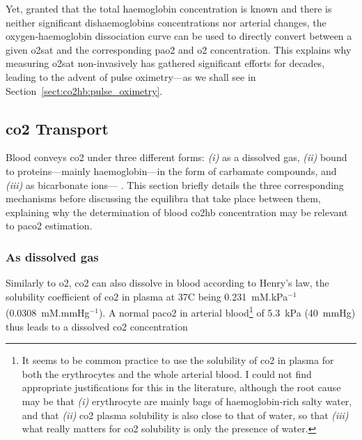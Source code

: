 Yet, granted that the total haemoglobin concentration is known and there is neither significant dishaemoglobins concentrations nor arterial \pH{} changes, the oxygen-haemoglobin dissociation curve can be used to directly convert between a given \gls{o2sat} and the corresponding \gls{pao2} and \gls{o2} concentration\cite[Chap.~11]{nunns}. This explains why measuring \gls{o2sat} non-invasively has gathered significant efforts for decades, leading to the advent of pulse oximetry---as we shall see in Section~\ref{sect:co2hb:pulse_oximetry}.

\subsection{\texorpdfstring{\gls{co2}}{CO2} Transport}\label{subsect:co2hb:co2_transport}

Blood conveys \gls{co2} under three different forms: \textit{(i)} as a dissolved gas, \textit{(ii)} bound to proteins---mainly haemoglobin---in the form of carbamate compounds, and \textit{(iii)} as bicarbonate ions---\ie{} . This section briefly details the three corresponding mechanisms before discussing the equilibra that take place between them, explaining why the determination of blood \gls{co2hb} concentration may be relevant to \gls{paco2} estimation.


\subsubsection{As dissolved gas}

Similarly to \gls{o2}, \gls{co2} can also dissolve in blood according to Henry's law, the solubility coefficient of \gls{co2} in plasma at 37{\degree}C being 0.231~mM.kPa$^{-1}$ (0.0308~mM.mmHg$^{-1}$)\cite[Table~10.1]{nunns}. A normal \gls{paco2} in arterial blood\footnote{It seems to be common practice to use the solubility of \gls{co2} in plasma for both the erythrocytes and the whole arterial blood\cite{geers2000}. I could not find appropriate justifications for this in the literature, although the root cause may be that \textit{(i)} erythrocyte are mainly bags of haemoglobin-rich salty water, and that \textit{(ii)} \gls{co2} plasma solubility is also close to that of water, so that \textit{(iii)} what really matters for \gls{co2} solubility is only the presence of water.} of 5.3~kPa (40~mmHg) thus leads to a dissolved \gls{co2} concentration

